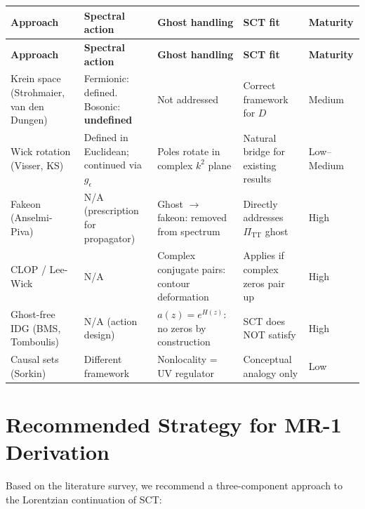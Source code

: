 \documentclass[12pt,a4paper]{article}
\theoremstyle{definition}
\theoremstyle{remark}
\begin{document}
\begin{center}
\small
\begin{longtable}{p{2.5cm}p{3cm}p{3cm}p{3cm}p{2cm}}
\toprule
\textbf{Approach} & \textbf{Spectral action} & \textbf{Ghost handling}
  & \textbf{SCT fit} & \textbf{Maturity} \\
\midrule
\endfirsthead
\toprule
\textbf{Approach} & \textbf{Spectral action} & \textbf{Ghost handling}
  & \textbf{SCT fit} & \textbf{Maturity} \\
\midrule
\endhead
\bottomrule
\endlastfoot
Krein space (Strohmaier, van den Dungen)
  & Fermionic: defined. Bosonic: \textbf{undefined}
  & Not addressed
  & Correct framework for $D$
  & Medium \\
Wick rotation (Visser, KS)
  & Defined in Euclidean; continued via $g_\epsilon$
  & Poles rotate in complex $k^2$ plane
  & Natural bridge for existing results
  & Low--Medium \\
Fakeon (Anselmi-Piva)
  & N/A (prescription for propagator)
  & Ghost $\to$ fakeon: removed from spectrum
  & Directly addresses $\Pi_{\mathrm{TT}}$ ghost
  & High \\
CLOP / Lee-Wick
  & N/A
  & Complex conjugate pairs: contour deformation
  & Applies if complex zeros pair up
  & High \\
Ghost-free IDG (BMS, Tomboulis)
  & N/A (action design)
  & $a(z) = e^{H(z)}$: no zeros by construction
  & SCT does NOT satisfy
  & High \\
Causal sets (Sorkin)
  & Different framework
  & Nonlocality = UV regulator
  & Conceptual analogy only
  & Low \\
\end{longtable}
\end{center}


\section{Recommended Strategy for MR-1 Derivation}
\label{sec:strategy}

Based on the literature survey, we recommend a three-component
approach to the Lorentzian continuation of SCT:
\end{document}
